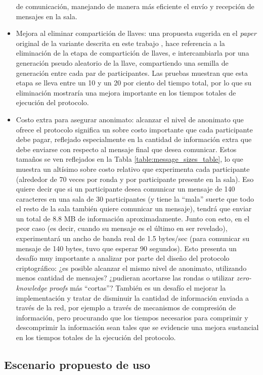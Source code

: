 \begin{itemize}
	de comunicación, manejando de manera más eficiente el envío y recepción de mensajes en la sala.
	\item Mejora al eliminar compartición de llaves: una propuesta sugerida en el \emph{paper} 
	original de la variante descrita en este trabajo \cite{franck2014dining}, hace referencia 
	a la eliminación de la etapa de compartición de llaves, e intercambiarla por una generación 
	pseudo aleatorio de la llave, compartiendo una semilla de generación entre cada par de participantes. 
	Las pruebas muestran que esta etapa se lleva entre un 10 y un 20 por ciento del tiempo total, 
	por lo que su eliminación mostraría una mejora importante en los tiempos totales de 
	ejecución del protocolo. 
	\item Costo extra para asegurar anonimato: alcanzar el nivel de anonimato que ofrece 
	el protocolo significa un sobre costo importante que cada participante debe pagar, reflejado 
	especialmente en la cantidad de información extra que debe enviarse con respecto al mensaje 
	final que desea comunicar. Estos tamaños se ven reflejados en la Tabla \ref{table:message_sizes_table}, 
	lo que muestra un altísimo sobre costo relativo que experimenta cada participante (alrededor de 
	70 veces por ronda y por participante presente en la sala). Eso quiere decir que si un participante 
	desea comunicar un mensaje de 140 caracteres en una sala de 30 participantes (y tiene la ``mala'' suerte 
	que todo el resto de la sala también quiere comunicar un mensaje), tendrá que enviar un 
	total de 8.8 MB de información aproximadamente. Junto con esto, en el peor caso (es decir, cuando 
	su mensaje es el último en ser revelado), experimentará un ancho de banda real de 1.5 bytes/sec 
	(para comunicar su mensaje de 140 bytes, tuvo que esperar 90 segundos). Esto presenta 
	un desafío muy importante a analizar por parte del diseño del protocolo criptográfico: ¿es 
	posible alcanzar el mismo nivel de anonimato, utilizando menos cantidad de mensajes? 
	¿pudieran acortarse las rondas o utilizar \emph{zero-knowledge proofs} más ``cortas''? 
	También es un desafío el mejorar la implementación y tratar de disminuir la cantidad de información 
	enviada a través de la red, por ejemplo a través de mecanismos de compresión de información, pero 
	procurando que los tiempos necesarios para comprimir y descomprimir la información sean tales 
	que se evidencie una mejora sustancial en los tiempos totales de la ejecución del protocolo.
\end{itemize}

\subsection{Escenario propuesto de uso}


